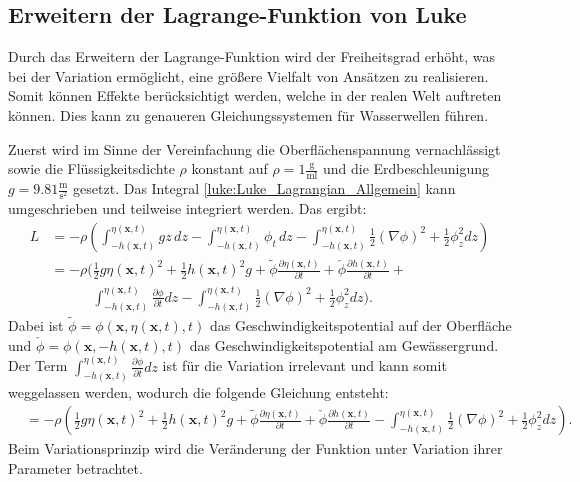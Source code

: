 \subsection{Erweitern der Lagrange-Funktion von Luke
	\label{luke:subsection:Erweitern}}

Durch das Erweitern der Lagrange-Funktion wird der Freiheitsgrad erhöht, was bei der Variation ermöglicht, eine größere Vielfalt von Ansätzen zu realisieren.
Somit können Effekte berücksichtigt werden, welche in der realen Welt auftreten können. Dies kann zu genaueren Gleichungssystemen für Wasserwellen führen.

Zuerst wird im Sinne der Vereinfachung die Oberflächenspannung vernachlässigt sowie die Flüssigkeitsdichte $\rho$ konstant auf $\rho = 1\frac{\text{g}}{\text{ml}}$ und die Erdbeschleunigung $g = 9.81\frac{\text{m}}{\text{s}^2}$ gesetzt.
Das Integral \eqref{luke:Luke_Lagrangian_Allgemein} kann umgeschrieben und teilweise integriert werden. 
Das ergibt:
\begin{align*}
	L
	&=
	-\rho\left(\int_{-h(\bm{x},t)}^{\eta(\bm{x},t)} g z\, dz - \int_{-h(\bm{x},t)}^{\eta(\bm{x},t)} \phi_t\, dz -\int_{-h(\bm{x},t)}^{\eta(\bm{x},t)} \frac{1}{2}\left(\nabla\phi\right)^2 + \frac{1}{2}\phi_z^2 dz\right)
	\\
	&=
	-\rho\Bigg(\frac{1}{2}g\eta(\bm{x},t)^2 + \frac{1}{2}h(\bm{x},t)^2g +\tilde{\phi} \frac{\partial\eta(\bm{x},t)}{\partial t} + \check{\phi} \frac{\partial h(\bm{x},t)}{\partial t} + \\ &\qquad\quad\int_{-h(\bm{x},t)}^{\eta(\bm{x},t)} \frac{\partial \phi}{\partial t}dz
	-\int_{-h(\bm{x},t)}^{\eta(\bm{x},t)} \frac{1}{2}\left(\nabla\phi\right)^2 + \frac{1}{2}\phi_z^2 dz\Bigg).
\end{align*}
Dabei ist $\tilde{\phi} = \phi(\bm{x},\eta(\bm{x},t),t)$ das Geschwindigkeitspotential auf der Oberfläche und $\check{\phi} = \phi(\bm{x},-h(\bm{x},t),t)$ das Geschwindigkeitspotential am Gewässergrund.
Der Term $\int_{-h(\bm{x},t)}^{\eta(\bm{x},t)} \frac{\partial \phi}{\partial t}dz$ ist für die Variation irrelevant und kann somit weggelassen werden, wodurch die folgende Gleichung entsteht:
\begin{align*}
	&=
	-\rho\left(\frac{1}{2}g\eta(\bm{x},t)^2 + \frac{1}{2}h(\bm{x},t)^2g +\tilde{\phi} \frac{\partial\eta(\bm{x},t)}{\partial t} + \check{\phi} \frac{\partial h(\bm{x},t)}{\partial t}-\int_{-h(\bm{x},t)}^{\eta(\bm{x},t)} \frac{1}{2}\left(\nabla\phi\right)^2 + \frac{1}{2}\phi_z^2 dz\right).
\end{align*}
Beim Variationsprinzip wird die Veränderung der Funktion unter Variation ihrer Parameter betrachtet.
